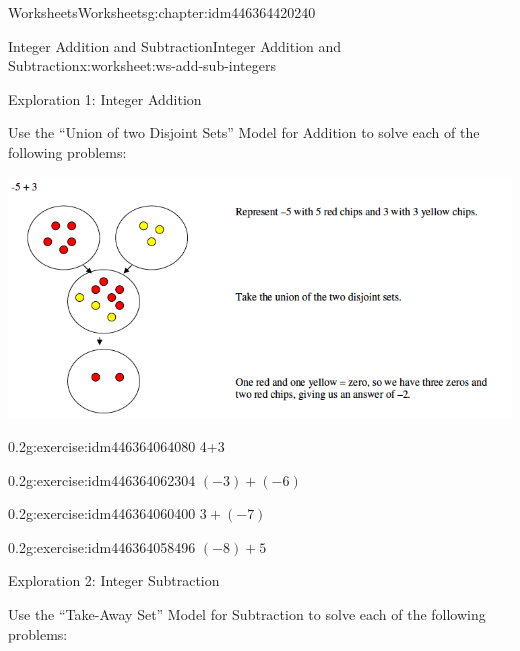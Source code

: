 \documentclass[twoside,11pt,]{book}
\begin{document}
\begin{chapterptx}{Worksheets}{}{Worksheets}{}{}{g:chapter:idm446364420240}
%
\begin{worksheet-section-numberless}{Integer Addition and Subtraction}{}{Integer Addition and Subtraction}{}{}{x:worksheet:ws-add-sub-integers}
\begin{introduction}{}%
Exploration 1: Integer Addition%
\par
Use the ``Union of two Disjoint Sets'' Model for Addition to solve each of the following problems: \begin{sidebyside}{1}{0}{0}{0}%
\begin{sbspanel}{1}%
\includegraphics[width=1\linewidth]{images/integer-add-model.png}
\end{sbspanel}%
\end{sidebyside}%
%
\end{introduction}%
\begin{divisionexercise}{1}{}{0.2}{g:exercise:idm446364064080}%
4+3%
\end{divisionexercise}%
\clearpage
\begin{divisionexercise}{2}{}{0.2}{g:exercise:idm446364062304}%
\((-3)+(-6) \)%
\end{divisionexercise}%
\begin{divisionexercise}{3}{}{0.2}{g:exercise:idm446364060400}%
\(3+(-7) \)%
\end{divisionexercise}%
\begin{divisionexercise}{4}{}{0.2}{g:exercise:idm446364058496}%
\((-8)+ 5 \)%
\end{divisionexercise}%
\clearpage
\begin{introduction}{}%
Exploration 2: Integer Subtraction%
\par
Use the ``Take-Away Set'' Model for Subtraction to solve each of the following problems: \begin{sidebyside}{1}{0}{0}{0}%
\begin{sbspanel}{1}%

\end{sbspanel}
\end{sidebyside}
\end{introduction}
\end{worksheet-section-numberless}
\end{chapterptx}
\end{document}
